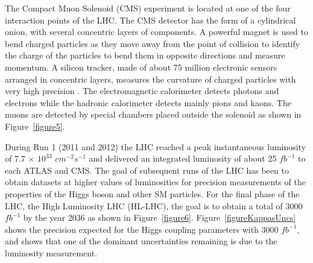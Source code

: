 \documentclass[final,3p]{CSP}
\begin{document}
The Compact Muon Solenoid (CMS) experiment is located at one of the four interaction points of the LHC.
The CMS detector has the form of a cylindrical onion, with several concentric layers of components.
A powerful magnet is used to bend charged particles as they move away from the point of collision to identify the charge of the particles to bend them in opposite directions and measure momentum.
A silicon tracker, made of about 75 million electronic sensors arranged in concentric layers, measures the curvature of charged particles with very high precision \cite{Chatrchyan:2008aa}.
The electromagnetic calorimeter detects photons and electrons while the hadronic calorimeter detects mainly pions and kaons.
The muons are detected by special chambers placed outside the solenoid as shown in Figure~\ref{figure5}.


During Run 1 (2011 and 2012) the LHC reached a peak instantaneous luminosity of 7.7 $\times$ $10^{33}$ $cm^{-2}s^{-1}$ and delivered an integrated luminosity of about 25 $fb^{-1}$ to each ATLAS and CMS.
The goal of subsequent runs of the LHC has been to obtain datasets at higher values of luminosities for precision measurements of the properties of the Higgs boson and other SM particles.
For the final phase of the LHC, the  High Luminosity LHC (HL-LHC), the goal is to obtain a total of 3000 $fb^{-1}$ by the year 2036 as shown in Figure~\ref{figure6}.
Figure~\ref{figureKappasUncs} shows the precision expected for the Higgs coupling parameters  with 3000 $fb^{-1}$, and shows that one of the dominant uncertainties remaining is due to the luminosity measurement.
\end{document}
